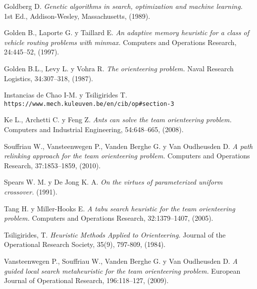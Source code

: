 \begin{thebibliography}{9}
Goldberg D.
\textit{Genetic algorithms in search, optimization and machine learning.}
1st Ed., Addison-Wesley, Massachusetts, (1989).

Golden B., Laporte G. y Taillard E.
\textit{An adaptive memory heuristic for a class of vehicle routing problems with minmax.}
Computers and Operations Research, 24:445–52, (1997).

Golden B.L., Levy L. y Vohra R. 
\textit{The orienteering problem.}
Naval Research Logistics, 34:307–318, (1987).

Instancias de Chao I-M. y Tsiligirides T.
\\\texttt{https://www.mech.kuleuven.be/en/cib/op\#section-3}

Ke L., Archetti C. y Feng Z.
\textit{Ants can solve the team orienteering problem.}
Computers and Industrial Engineering, 54:648–665, (2008).

Souffriau W., Vansteenwegen P., Vanden Berghe G. y Van Oudheusden D.
\textit{A path relinking approach for the team orienteering problem.}
Computers and Operations Research, 37:1853–1859, (2010).

Spears W. M. y De Jong K. A. 
\textit{On the virtues of parameterized uniform crossover.}
(1991).

Tang H. y Miller-Hooks E.
\textit{A tabu search heuristic for the team orienteering problem.}
Computers and Operations Research, 32:1379–1407, (2005).

Tsiligirides, T.
\textit{Heuristic Methods Applied to Orienteering.}
Journal of the Operational Research Society, 35(9), 797-809, (1984).

Vansteenwegen P., Souffriau W., Vanden Berghe G. y Van Oudheusden D.
\textit{A guided local search metaheuristic for the team orienteering problem.}
European Journal of Operational Research, 196:118–127, (2009).


\end{thebibliography}
